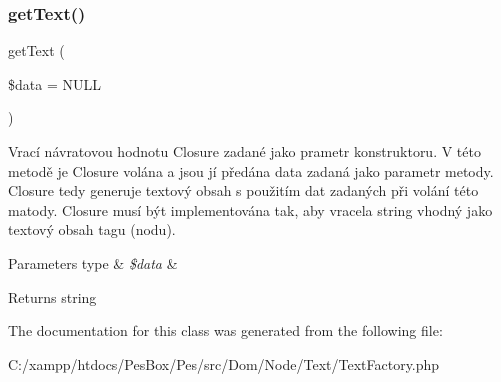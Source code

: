 \subsubsection{\texorpdfstring{get\+Text()}{getText()}}
{\footnotesize\ttfamily get\+Text (\begin{DoxyParamCaption}\item[{}]{\$data = {\ttfamily NULL} }\end{DoxyParamCaption})}

Vrací návratovou hodnotu Closure zadané jako prametr konstruktoru. V této metodě je Closure volána a jsou jí předána data zadaná jako parametr metody. Closure tedy generuje textový obsah s použitím dat zadaných při volání této matody. Closure musí být implementována tak, aby vracela string vhodný jako textový obsah tagu (nodu).


\begin{DoxyParams}[1]{Parameters}
type & {\em \$data} & \\
\hline
\end{DoxyParams}
\begin{DoxyReturn}{Returns}
string 
\end{DoxyReturn}


The documentation for this class was generated from the following file\+:\begin{DoxyCompactItemize}
\item 
C\+:/xampp/htdocs/\+Pes\+Box/\+Pes/src/\+Dom/\+Node/\+Text/Text\+Factory.\+php\end{DoxyCompactItemize}
